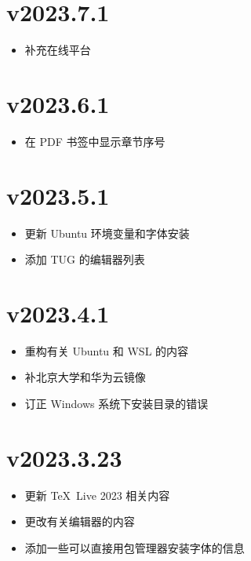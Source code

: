 \section*{v2023.7.1}

\begin{itemize}
  \item 补充在线平台
\end{itemize}

\section*{v2023.6.1}

\begin{itemize}
  \item 在 PDF 书签中显示章节序号
\end{itemize}

\section*{v2023.5.1}

\begin{itemize}
  \item 更新 Ubuntu 环境变量和字体安装
  \item 添加 TUG 的编辑器列表
\end{itemize}

\section*{v2023.4.1}

\begin{itemize}
  \item 重构有关 Ubuntu 和 WSL 的内容
  \item 补北京大学和华为云镜像
  \item 订正 Windows 系统下安装目录的错误
\end{itemize}

\section*{v2023.3.23}

\begin{itemize}
  \item 更新 \TeX\ Live 2023 相关内容
  \item 更改有关编辑器的内容
  \item 添加一些可以直接用包管理器安装字体的信息
\end{itemize}

